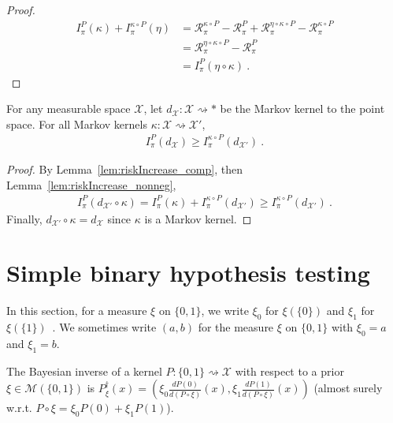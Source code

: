 \begin{proof}%
\uses{}
\begin{align*}
I^P_\pi(\kappa) + I^{\kappa \circ P}_\pi(\eta)
&= \mathcal R^{\kappa \circ P}_\pi - \mathcal R^{P}_\pi + \mathcal R^{\eta \circ \kappa \circ P}_\pi - \mathcal R^{\kappa \circ P}_\pi
\\
&= \mathcal R^{\eta \circ \kappa \circ P}_\pi - \mathcal R^{P}_\pi
\\
&= I^P_\pi(\eta \circ \kappa)
\: .
\end{align*}
\end{proof}

\begin{lemma}
  \label{lem:riskIncrease_comp_del}
  \mathlibok
  For any measurable space $\mathcal X$, let $d_{\mathcal X} : \mathcal X \rightsquigarrow *$ be the Markov kernel to the point space.
  For all Markov kernels $\kappa : \mathcal X \rightsquigarrow \mathcal X'$,
  \begin{align*}
  I_\pi^P(d_{\mathcal X}) \ge I_\pi^{\kappa \circ P}(d_{\mathcal X'}) \: .
  \end{align*}
\end{lemma}

\begin{proof}\mathlibok
{}
By Lemma~\ref{lem:riskIncrease_comp}, then Lemma~\ref{lem:riskIncrease_nonneg},
\begin{align*}
I_\pi^P(d_{\mathcal X'} \circ \kappa)
= I^P_\pi(\kappa) + I^{\kappa \circ P}_\pi(d_{\mathcal X'})
\ge I_\pi^{\kappa \circ P}(d_{\mathcal X'})
\: .
\end{align*}
Finally, $d_{\mathcal X'} \circ \kappa = d_{\mathcal X}$ since $\kappa$ is a Markov kernel.
\end{proof}




\section{Simple binary hypothesis testing}

In this section, for a measure $\xi$ on $\{0,1\}$, we write $\xi_0$ for $\xi(\{0\})$ and $\xi_1$ for $\xi(\{1\})$~. We sometimes write $(a,b)$ for the measure $\xi$ on $\{0,1\}$ with $\xi_0 = a$ and $\xi_1 = b$.

\begin{lemma}
  \label{lem:bayesInv_binary}
  \mathlibok
  The Bayesian inverse of a kernel $P : \{0,1\} \rightsquigarrow \mathcal X$ with respect to a prior $\xi \in \mathcal M(\{0,1\})$ is $P_\xi^\dagger(x) = \left(\xi_0\frac{d P(0)}{d(P \circ \xi)}(x), \xi_1\frac{d P(1)}{d(P \circ \xi)}(x)\right)$ (almost surely w.r.t. $P \circ \xi = \xi_0 P(0) + \xi_1 P(1)$).
\end{lemma}


